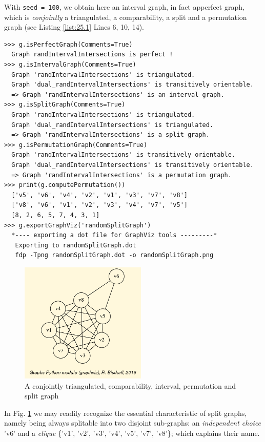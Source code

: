 With \texttt{seed = 100}, we obtain here an interval graph, in fact apperfect graph, which is \emph{conjointly} a triangulated, a comparability, a split and a permutation graph (see Listing \ref{list:25.1} Lines 6, 10, 14).
\begin{lstlisting}[caption={Testing perfect graph categories.},label=list:25.1,basicstyle=\scriptsize]
>>> g.isPerfectGraph(Comments=True)
  Graph randIntervalIntersections is perfect !
>>> g.isIntervalGraph(Comments=True)
  Graph 'randIntervalIntersections' is triangulated.
  Graph 'dual_randIntervalIntersections' is transitively orientable.
  => Graph 'randIntervalIntersections' is an interval graph.
>>> g.isSplitGraph(Comments=True)
  Graph 'randIntervalIntersections' is triangulated.
  Graph 'dual_randIntervalIntersections' is triangulated.
  => Graph 'randIntervalIntersections' is a split graph.
>>> g.isPermutationGraph(Comments=True)
  Graph 'randIntervalIntersections' is transitively orientable.
  Graph 'dual_randIntervalIntersections' is transitively orientable.
  => Graph 'randIntervalIntersections' is a permutation graph.
>>> print(g.computePermutation())
  ['v5', 'v6', 'v4', 'v2', 'v1', 'v3', 'v7', 'v8']
  ['v8', 'v6', 'v1', 'v2', 'v3', 'v4', 'v7', 'v5']
  [8, 2, 6, 5, 7, 4, 3, 1]
>>> g.exportGraphViz('randomSplitGraph')
  *---- exporting a dot file for GraphViz tools ---------*
   Exporting to randomSplitGraph.dot
   fdp -Tpng randomSplitGraph.dot -o randomSplitGraph.png
\end{lstlisting}
\begin{figure}[h]
\sidecaption
\includegraphics[width=6cm]{Figures/randomSplitGraph.png}
\caption{A conjointly triangulated, comparability, interval, permutation and split graph} 
\label{fig:25.1}       %
\end{figure}

In Fig. \ref{fig:25.1} we may readily recognize the essential characteristic of split graphs, namely being always splitable into two disjoint sub-graphs: an \emph{independent choice} {'v6'} and a \emph{clique} \{'v1', 'v2', 'v3', 'v4', 'v5', 'v7', 'v8'\}; which explains their name.

